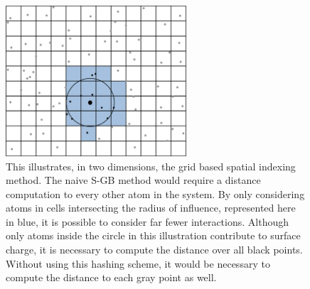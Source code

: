 \begin{figure}[h]
\begin{center}
\includegraphics[width=0.6\textwidth]{figures/grid4_crop.png}
\caption{This illustrates, in two dimensions, the grid based spatial indexing method.
The naive S-GB method would require a distance computation to every other atom in the system.
By only considering atoms in cells intersecting the radius of influence, represented here in blue, it is possible to consider far fewer interactions.
Although only atoms inside the circle in this illustration contribute to surface charge, it is necessary to compute the distance over all black points.
Without using this hashing scheme, it would be necessary to compute the distance to each gray point as well.}
\label{figure:grid_hash}
\end{center}
\end{figure}

